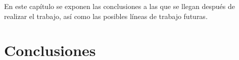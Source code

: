 
En este capítulo se exponen las conclusiones a las que se llegan después de realizar el trabajo, así como las posibles líneas de trabajo futuras.

\section{Conclusiones}

